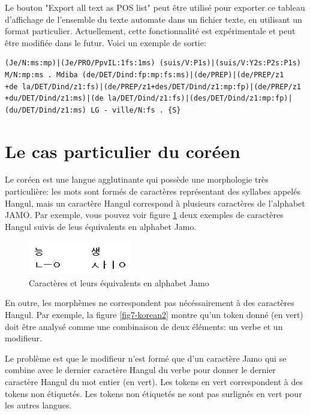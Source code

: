 \bigskip
\noindent Le bouton "Export all text as POS list" peut être utilisé pour exporter ce tableau d'affichage de l'ensemble du texte automate dans un fichier texte, en utilisant un format particulier. Actuellement, cette fonctionnalité est expérimentale et peut être modifiée dans le futur. Voici un exemple de sortie:

\begin{verbatim}
(Je/N:ms:mp)|(Je/PRO/PpvIL:1fs:1ms) (suis/V:P1s)|(suis/V:Y2s:P2s:P1s) 
M/N:mp:ms . Mdiba (de/DET/Dind:fp:mp:fs:ms)|(de/PREP)|(de/PREP/z1
+de la/DET/Dind/z1:fs)|(de/PREP/z1+des/DET/Dind/z1:mp:fp)|(de/PREP/z1
+du/DET/Dind/z1:ms)|(de la/DET/Dind/z1:fs)|(des/DET/Dind/z1:mp:fp)|
(du/DET/Dind/z1:ms) LG - ville/N:fs . {S}
\end{verbatim}



\section{Le cas particulier du coréen}
\label{section-korean}
Le coréen est une langue  agglutinante qui possède une morphologie très particulière: les mots sont
formés de caractères représentant des syllabes appelés Hangul, mais un caractère Hangul correspond à
plusieurs caractères de l'alphabet JAMO. Par exemple, vous pouvez voir figure \ref{fig7-korean1} deux exemples de caractères Hangul suivis de leus équivalents en alphabet Jamo.

\begin{figure}[!ht]
\begin{center}
\includegraphics[width=4.5cm]{resources/img/fig7-korean1.png}
\caption{Caractères et leurs équivalents en alphabet Jamo
\label{fig7-korean1}}
\end{center}
\end{figure}

\noindent En outre, les morphèmes ne  correspondent pas nécéssairement à des caractères Hangul.
Par exemple, la figure \ref{fig7-korean2} montre qu'un token donné (en vert) doit être analysé
comme une combinaison de deux éléments: un verbe et un modifieur.

Le problème est que le modifieur n'est formé que d'un caractère Jamo qui se
combine avec le dernier caractère Hangul du verbe pour donner le dernier caractère
Hangul du mot entier (en vert). Les tokens en vert correspondent à des tokens non étiquetés.
Les tokens non étiquetés ne sont pas surlignés en vert pour les autres langues.


